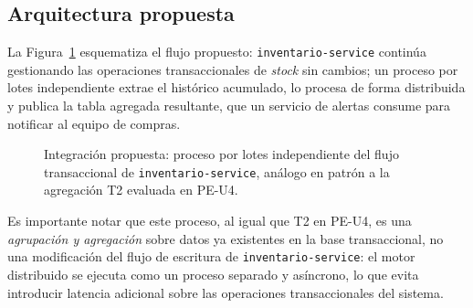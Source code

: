 \documentclass[11pt,a4paper]{article}
\begin{document}
    \subsection{Arquitectura propuesta}

    La Figura~\ref{fig:arquitectura-propuesta} esquematiza el flujo
    propuesto: \texttt{inventario-service} continúa gestionando las
    operaciones transaccionales de \emph{stock} sin cambios; un proceso
    por lotes independiente extrae el histórico acumulado, lo procesa de
    forma distribuida y publica la tabla agregada resultante, que un
    servicio de alertas consume para notificar al equipo de compras.

    \begin{figure}[h]
        \centering
        \caption{Integración propuesta: proceso por lotes independiente del
        flujo transaccional de \texttt{inventario-service}, análogo en
        patrón a la agregación T2 evaluada en PE-U4.}
        \label{fig:arquitectura-propuesta}
    \end{figure}

    Es importante notar que este proceso, al igual que T2 en PE-U4, es
    una \emph{agrupación y agregación} sobre datos ya existentes en la
    base transaccional, no una modificación del flujo de escritura de
    \texttt{inventario-service}: el motor distribuido se ejecuta como un
    proceso separado y asíncrono, lo que evita introducir latencia
    adicional sobre las operaciones transaccionales del sistema.
\end{document}
